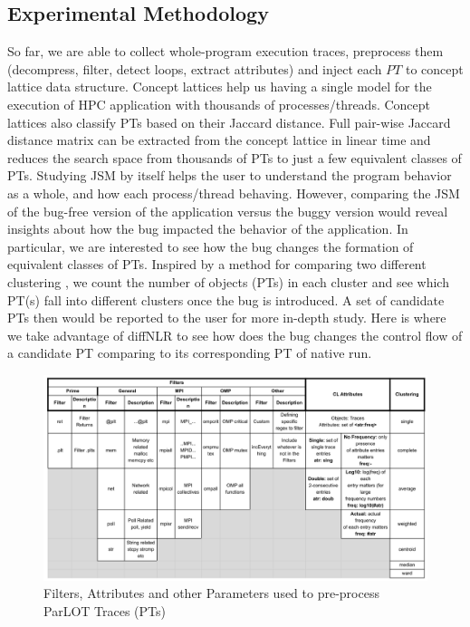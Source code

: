 \subsection{Experimental Methodology}
So far, we are able to collect whole-program execution traces, preprocess them (decompress, filter, detect loops, extract attributes) and inject each $PT$ to concept lattice data structure.
%
Concept lattices help us having a single model for the execution of HPC application with thousands of processes/threads.
%
Concept lattices also classify PTs based on their Jaccard distance.
%
Full pair-wise Jaccard distance matrix can be extracted from the concept lattice in linear time and reduces the search space from thousands of PTs to just a few equivalent classes of PTs.
%
Studying JSM by itself helps the user to understand the program behavior as a whole, and how each process/thread behaving.
%
However, comparing the JSM of the bug-free version of the application versus the buggy version would reveal insights about how the bug impacted the behavior of the application.
%
In particular, we are interested to see how the bug changes the formation of equivalent classes of PTs.
%
Inspired by a method for comparing two different clustering \cite{fowlkes83}, we count the number of objects (PTs) in each cluster and see which PT(s) fall into different clusters once the bug is introduced.
%
A set of candidate PTs then would be reported to the user for more in-depth study.
%
Here is where we take advantage of diffNLR to see how does the bug changes the control flow of a candidate PT comparing to its corresponding PT of native run.
%

\begin{figure}[t]
\centering
\includegraphics[width=6in]{figs/parametersTable.png}
\caption{Filters, Attributes and other Parameters used to pre-process ParLOT Traces (PTs)}
\label{tab:parameters}
\end{figure}

